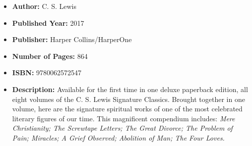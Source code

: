 \documentclass{tufte-handout}
\begin{document}
\begin{itemize}
    \item[] \textbf{Author:} C. S. Lewis
    \item[] \textbf{Published Year:} 2017
    \item[] \textbf{Publisher:} Harper Collins/HarperOne
    \item[] \textbf{Number of Pages:} 864
    \item[] \textbf{ISBN:} 9780062572547
    \item[] \textbf{Description:} Available for the first time in one deluxe paperback edition, all eight volumes of the C. S. Lewis Signature Classics. Brought together in one volume, here are the signature spiritual works of one of the most celebrated literary figures of our time. This magnificent compendium includes: \textit{Mere Christianity; The Screwtape Letters; The Great Divorce; The Problem of Pain; Miracles; A Grief Observed; Abolition of Man; The Four Loves.}
\end{itemize}
\end{document}
